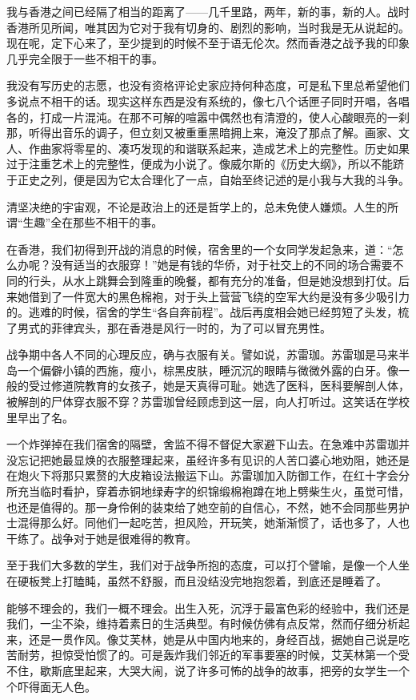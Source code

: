 \par 我与香港之间已经隔了相当的距离了——几千里路，两年，新的事，新的人。战时香港所见所闻，唯其因为它对于我有切身的、剧烈的影响，当时我是无从说起的。现在呢，定下心来了，至少提到的时候不至于语无伦次。然而香港之战予我的印象几乎完全限于一些不相干的事。
\par 我没有写历史的志愿，也没有资格评论史家应持何种态度，可是私下里总希望他们多说点不相干的话。现实这样东西是没有系统的，像七八个话匣子同时开唱，各唱各的，打成一片混沌。在那不可解的喧嚣中偶然也有清澄的，使人心酸眼亮的一刹那，听得出音乐的调子，但立刻又被重重黑暗拥上来，淹没了那点了解。画家、文人、作曲家将零星的、凑巧发现的和谐联系起来，造成艺术上的完整性。历史如果过于注重艺术上的完整性，便成为小说了。像威尔斯的《历史大纲》，所以不能跻于正史之列，便是因为它太合理化了一点，自始至终记述的是小我与大我的斗争。
\par 清坚决绝的宇宙观，不论是政治上的还是哲学上的，总未免使人嫌烦。人生的所谓“生趣”全在那些不相干的事。
\par 在香港，我们初得到开战的消息的时候，宿舍里的一个女同学发起急来，道：“怎么办呢？没有适当的衣服穿！”她是有钱的华侨，对于社交上的不同的场合需要不同的行头，从水上跳舞会到隆重的晚餐，都有充分的准备，但是她没想到打仗。后来她借到了一件宽大的黑色棉袍，对于头上营营飞绕的空军大约是没有多少吸引力的。逃难的时候，宿舍的学生“各自奔前程”。战后再度相会她已经剪短了头发，梳了男式的菲律宾头，那在香港是风行一时的，为了可以冒充男性。
\par 战争期中各人不同的心理反应，确与衣服有关。譬如说，苏雷珈。苏雷珈是马来半岛一个偏僻小镇的西施，瘦小，棕黑皮肤，睡沉沉的眼睛与微微外露的白牙。像一般的受过修道院教育的女孩子，她是天真得可耻。她选了医科，医科要解剖人体，被解剖的尸体穿衣服不穿？苏雷珈曾经顾虑到这一层，向人打听过。这笑话在学校里早出了名。
\par 一个炸弹掉在我们宿舍的隔壁，舍监不得不督促大家避下山去。在急难中苏雷珈并没忘记把她最显焕的衣服整理起来，虽经许多有见识的人苦口婆心地劝阻，她还是在炮火下将那只累赘的大皮箱设法搬运下山。苏雷珈加入防御工作，在红十字会分所充当临时看护，穿着赤铜地绿寿字的织锦缎棉袍蹲在地上劈柴生火，虽觉可惜，也还是值得的。那一身伶俐的装束给了她空前的自信心，不然，她不会同那些男护士混得那么好。同他们一起吃苦，担风险，开玩笑，她渐渐惯了，话也多了，人也干练了。战争对于她是很难得的教育。
\par 至于我们大多数的学生，我们对于战争所抱的态度，可以打个譬喻，是像一个人坐在硬板凳上打瞌盹，虽然不舒服，而且没结没完地抱怨着，到底还是睡着了。
\par 能够不理会的，我们一概不理会。出生入死，沉浮于最富色彩的经验中，我们还是我们，一尘不染，维持着素日的生活典型。有时候仿佛有点反常，然而仔细分析起来，还是一贯作风。像艾芙林，她是从中国内地来的，身经百战，据她自己说是吃苦耐劳，担惊受怕惯了的。可是轰炸我们邻近的军事要塞的时候，艾芙林第一个受不住，歇斯底里起来，大哭大闹，说了许多可怖的战争的故事，把旁的女学生一个个吓得面无人色。
